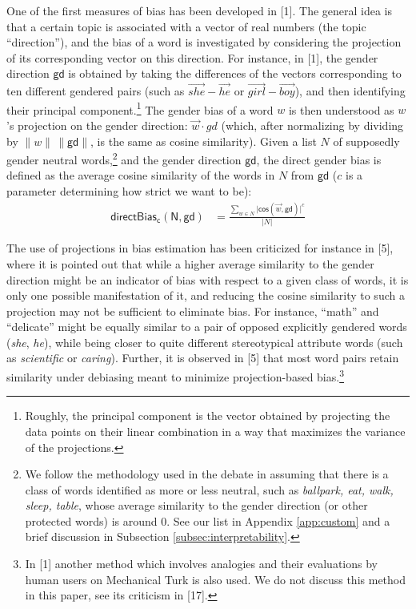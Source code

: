 \documentclass[
  12pt,
  dvipsnames,enabledeprecatedfontcommands]{scrartcl}
\begin{document}
One of the first measures of bias has been developed in {[}1{]}. The
general idea is that a certain topic is associated with a vector of real
numbers (the topic ``direction''), and the bias of a word is
investigated by considering the projection of its corresponding vector
on this direction. For instance, in {[}1{]}, the gender direction
\(\mathsf{gd}\) is obtained by taking the differences of the vectors
corresponding to ten different gendered pairs (such as
\(\overrightarrow{she} - \overrightarrow{he}\) or
\(\overrightarrow{girl} - \overrightarrow{boy}\)), and then identifying
their principal component.\footnote{Roughly, the principal component is
  the vector obtained by projecting the data points on their linear
  combination in a way that maximizes the variance of the projections.}
The gender bias of a word \(w\) is then understood as \(w\)'s projection
on the gender direction: \(\vec{w} \cdot gd\) (which, after normalizing
by dividing by \(\lVert w \rVert \,\lVert \mathsf{gd} \rVert\), is the
same as cosine similarity). Given a list \(N\) of supposedly gender
neutral words,\footnote{We follow the methodology used in the debate in
  assuming that there is a class of words identified as more or less
  neutral, such as \emph{ballpark, eat, walk, sleep, table}, whose
  average similarity to the gender direction (or other protected words)
  is around 0. See our list in Appendix \ref{app:custom} and a brief
  discussion in Subsection \ref{subsec:interpretability}.} and the
gender direction \(\mathsf{gd}\), the direct gender bias is defined as
the average cosine similarity of the words in \(N\) from \(\mathsf{gd}\)
(\(c\) is a parameter determining how strict we want to be):
\begin{align*}
\mathsf{directBias_c(N,gd)} & = \frac{\sum_{w\in N}\vert \mathsf{cos}(\vec{w},\mathsf{gd})\vert^c}{\vert N \vert }
\end{align*} \normalsize 

The use of projections in bias estimation has been criticized for
instance in {[}5{]}, where it is pointed out that while a higher average
similarity to the gender direction might be an indicator of bias with
respect to a given class of words, it is only one possible manifestation
of it, and reducing the cosine similarity to such a projection may not
be sufficient to eliminate bias. For instance, ``math'' and ``delicate''
might be equally similar to a pair of opposed explicitly gendered words
(\emph{she}, \emph{he}), while being closer to quite different
stereotypical attribute words (such as \emph{scientific} or
\emph{caring}). Further, it is observed in {[}5{]} that most word pairs
retain similarity under debiasing meant to minimize projection-based
bias.\footnote{In {[}1{]} another method which involves analogies and
  their evaluations by human users on Mechanical Turk is also used. We
  do not discuss this method in this paper, see its criticism in
  {[}17{]}.}
\end{document}
